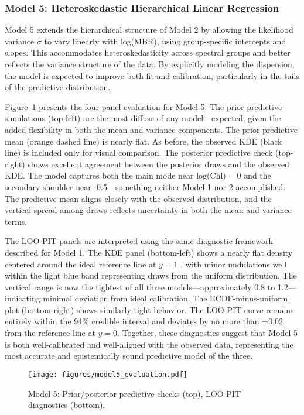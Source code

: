 \documentclass[preprint,authoryear]{elsarticle}
\begin{document}
\subsubsection{Model 5: Heteroskedastic Hierarchical Linear Regression}

Model 5 extends the hierarchical structure of Model 2 by allowing the likelihood variance $\sigma$ to vary linearly with log(MBR), using group-specific intercepts and slopes. This accommodates heteroskedasticity across spectral groups and better reflects the variance structure of the data. By explicitly modeling the dispersion, the model is expected to improve both fit and calibration, particularly in the tails of the predictive distribution.

Figure~\ref{fig:model5-eval} presents the four-panel evaluation for Model 5. The prior predictive simulations (top-left) are the most diffuse of any model—expected, given the added flexibility in both the mean and variance components. The prior predictive mean (orange dashed line) is nearly flat. As before, the observed KDE (black line) is included only for visual comparison. The posterior predictive check (top-right) shows excellent agreement between the posterior draws and the observed KDE. The model captures both the main mode near $\text{log(Chl)} = 0$ and the secondary shoulder near -0.5—something neither Model 1 nor 2 accomplished. The predictive mean aligns closely with the observed distribution, and the vertical spread among draws reflects uncertainty in both the mean and variance terms.

The LOO-PIT panels are interpreted using the same diagnostic framework described for Model 1. The KDE panel (bottom-left) shows a nearly flat density centered around the ideal reference line at $ y = 1$ , with minor undulations well within the light blue band representing draws from the uniform distribution. The vertical range is now the tightest of all three models—approximately 0.8 to 1.2—indicating minimal deviation from ideal calibration. The ECDF-minus-uniform plot (bottom-right) shows similarly tight behavior. The LOO-PIT curve remains entirely within the 94\% credible interval and deviates by no more than ±0.02 from the reference line at $ y = 0 $. Together, these diagnostics suggest that Model 5 is both well-calibrated and well-aligned with the observed data, representing the most accurate and epistemically sound predictive model of the three.




\begin{figure}[H]
\centering
\texttt{[image: figures/model5\_evaluation.pdf]}
\caption{Model 5: Prior/posterior predictive checks (top), LOO-PIT diagnostics (bottom).}
\label{fig:model5-eval}
\end{figure}
\end{document}
